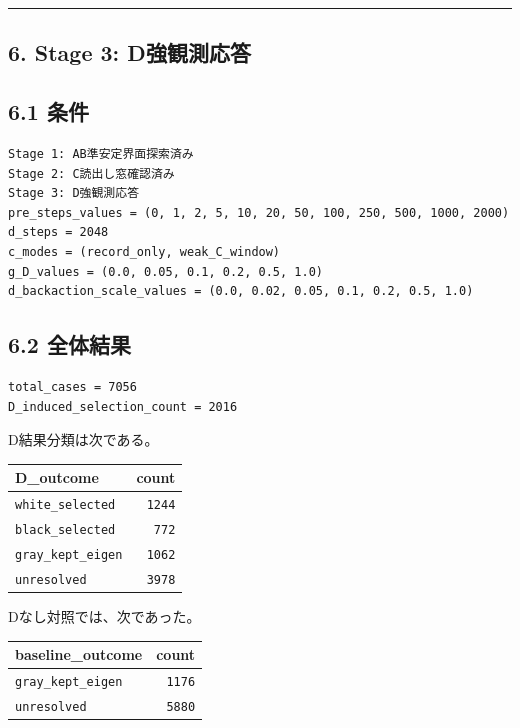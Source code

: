 \documentclass{article}
\newcounter{none}
\begin{document}
\begin{center}\rule{0.5\linewidth}{0.5pt}\end{center}

\subsection{6. Stage 3:
D強観測応答}\label{stage-3-dux5f37ux89b3ux6e2cux5fdcux7b54}

\subsection{6.1 条件}\label{ux6761ux4ef6-2}

\begin{verbatim}
Stage 1: AB準安定界面探索済み
Stage 2: C読出し窓確認済み
Stage 3: D強観測応答
pre_steps_values = (0, 1, 2, 5, 10, 20, 50, 100, 250, 500, 1000, 2000)
d_steps = 2048
c_modes = (record_only, weak_C_window)
g_D_values = (0.0, 0.05, 0.1, 0.2, 0.5, 1.0)
d_backaction_scale_values = (0.0, 0.02, 0.05, 0.1, 0.2, 0.5, 1.0)
\end{verbatim}

\subsection{6.2 全体結果}\label{ux5168ux4f53ux7d50ux679c}

\begin{verbatim}
total_cases = 7056
D_induced_selection_count = 2016
\end{verbatim}

D結果分類は次である。

{\def\LTcaptype{none} %
\begin{longtable}[]{@{}lr@{}}
\toprule\noalign{}
D\_outcome & count \\
\midrule\noalign{}
\endhead
\bottomrule\noalign{}
\endlastfoot
\texttt{white\_selected} & \texttt{1244} \\
\texttt{black\_selected} & \texttt{772} \\
\texttt{gray\_kept\_eigen} & \texttt{1062} \\
\texttt{unresolved} & \texttt{3978} \\
\end{longtable}
}

Dなし対照では、次であった。

{\def\LTcaptype{none} %
\begin{longtable}[]{@{}lr@{}}
\toprule\noalign{}
baseline\_outcome & count \\
\midrule\noalign{}
\endhead
\bottomrule\noalign{}
\endlastfoot
\texttt{gray\_kept\_eigen} & \texttt{1176} \\
\texttt{unresolved} & \texttt{5880} \\
\end{longtable}
}
\end{document}
